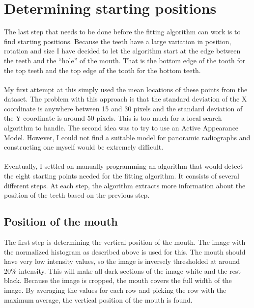 \documentclass[a4paper,10pt]{article}
\begin{document}
\section{Determining starting positions}
The last step that needs to be done before the fitting algorithm can work is to find starting positions. Because the teeth have a large variation in position, rotation and size I have decided to let the algorithm start at the edge between the teeth and the ``hole'' of the mouth. That is the bottom edge of the tooth for the top teeth and the top edge of the tooth for the bottom teeth.
\\\\
My first attempt at this simply used the mean locations of these points from the dataset. The problem with this approach is that the standard deviation of the X coordinate is anywhere between 15 and 30 pixels and the standard deviation of the Y coordinate is around 50 pixels. This is too much for a local search algorithm to handle. The second idea was to try to use an Active Appearance Model. However, I could not find a suitable model for panoramic radiographs and constructing one myself would be extremely difficult.
\\\\
Eventually, I settled on manually programming an algorithm that would detect the eight starting points needed for the fitting algorithm. It consists of several different steps. At each step, the algorithm extracts more information about the position of the teeth based on the previous step.

\subsection{Position of the mouth}
The first step is determining the vertical position of the mouth. The image with the normalized histogram as described above is used for this. The mouth should have very low intensity values, so the image is inversely thresholded at around 20\% intensity. This will make all dark sections of the image white and the rest black. Because the image is cropped, the mouth covers the full width of the image. By averaging the values for each row and picking the row with the maximum average, the vertical position of the mouth is found.
\end{document}
